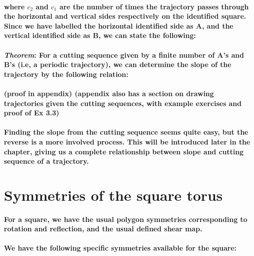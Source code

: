 \documentclass{report}
\begin{document}


\paragraph{where $c_{2}$ and $c_{1}$ are the number of times the trajectory passes through the horizontal and vertical sides respectively on the identified square.\\ Since we have labelled the horizontal identified side as A, and the vertical identified side as B, we can state the following:}

\paragraph{\textit{Theorem}: For a cutting sequence given by a finite number of A’s and B’s (i.e, a periodic trajectory), we can determine the slope of the trajectory by the following relation:}


\paragraph{(proof in appendix) 
(appendix also has a section on drawing trajectories given the cutting sequences, with example exercises and proof of Ex 3.3)}

\paragraph{Finding the slope from the cutting sequence seems quite easy, but the reverse is a more involved process. This will be introduced later in the chapter, giving us a complete relationship between slope and cutting sequence of a trajectory.}

\section{Symmetries of the square torus}

\paragraph{For a square, we have the usual polygon symmetries corresponding to rotation and reflection, and the usual defined shear map.}

\paragraph{We have the following specific symmetries available for the square:}
\end{document}
